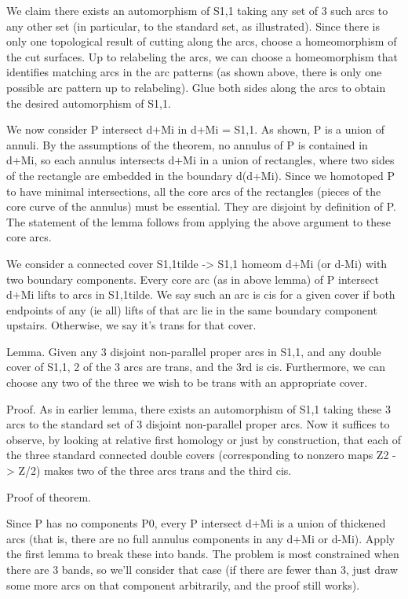\documentclass[12pt]{amsart}
\theoremstyle{definition}
\begin{document}
We claim there exists an automorphism of S1,1 taking any set of 3 such arcs to
any other set (in particular, to the standard set, as illustrated). Since there
is only one topological result of cutting along the arcs, choose
a homeomorphism of the cut surfaces. Up to relabeling the arcs, we can choose
a homeomorphism that identifies matching arcs in the arc patterns (as shown
above, there is only one possible arc pattern up to relabeling). Glue both
sides along the arcs to obtain the desired automorphism of S1,1.

We now consider P intersect d+Mi in d+Mi = S1,1. As shown, P is a union of
annuli. By the assumptions of the theorem, no annulus of P is contained in
d+Mi, so each annulus intersects d+Mi in a union of rectangles, where two sides
of the rectangle are embedded in the boundary d(d+Mi). Since we homotoped P to
have minimal intersections, all the core arcs of the rectangles (pieces of the
core curve of the annulus) must be essential. They are disjoint by definition
of P. The statement of the lemma follows from applying the above argument to
these core arcs.

We consider a connected cover S1,1tilde -> S1,1 homeom d+Mi (or d-Mi) with two
boundary components. Every core arc (as in above lemma) of P intersect d+Mi
lifts to arcs in S1,1tilde. We say such an arc is cis for a given cover if
both endpoints of any (ie all) lifts of that arc lie in the same boundary
component upstairs. Otherwise, we say it's trans for that cover.

Lemma. Given any 3 disjoint non-parallel proper arcs in S1,1, and any double
cover of S1,1, 2 of the 3 arcs are trans, and the 3rd is cis.
Furthermore, we can choose any two of the three we wish to be trans with an
appropriate cover.

Proof. As in earlier lemma, there exists an automorphism of S1,1
taking these 3 arcs to the standard set of 3 disjoint non-parallel proper arcs.
Now it suffices to observe, by looking at relative first homology or just by
construction, that each of the three standard connected double covers
(corresponding to nonzero maps Z2 -> Z/2) makes two of the three arcs trans and
the third cis.

Proof of theorem.

Since P has no components P0, every P intersect d+Mi is a union of thickened
arcs (that is, there are no full annulus components in any d+Mi or d-Mi). Apply
the first lemma to break these into bands. The problem is most constrained when
there are 3 bands, so we'll consider that case (if there are fewer than 3, just
draw some more arcs on that component arbitrarily, and the proof still works).
\end{document}
